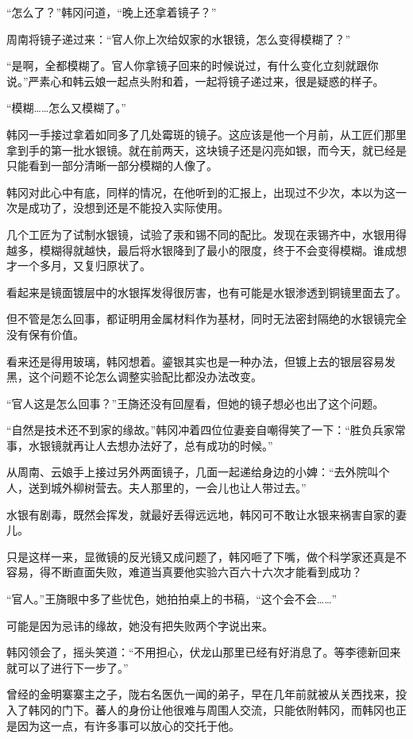 “怎么了？”韩冈问道，“晚上还拿着镜子？”

周南将镜子递过来：“官人你上次给奴家的水银镜，怎么变得模糊了？”

“是啊，全都模糊了。官人你拿镜子回来的时候说过，有什么变化立刻就跟你说。”严素心和韩云娘一起点头附和着，一起将镜子递过来，很是疑惑的样子。

“模糊……怎么又模糊了。”

韩冈一手接过拿着如同多了几处霉斑的镜子。这应该是他一个月前，从工匠们那里拿到手的第一批水银镜。就在前两天，这块镜子还是闪亮如银，而今天，就已经是只能看到一部分清晰一部分模糊的人像了。

韩冈对此心中有底，同样的情况，在他听到的汇报上，出现过不少次，本以为这一次是成功了，没想到还是不能投入实际使用。

几个工匠为了试制水银镜，试验了汞和锡不同的配比。发现在汞锡齐中，水银用得越多，模糊得就越快，最后将水银降到了最小的限度，终于不会变得模糊。谁成想才一个多月，又复归原状了。

看起来是镜面镀层中的水银挥发得很厉害，也有可能是水银渗透到铜镜里面去了。

但不管是怎么回事，都证明用金属材料作为基材，同时无法密封隔绝的水银镜完全没有保有价值。

看来还是得用玻璃，韩冈想着。鎏银其实也是一种办法，但镀上去的银层容易发黑，这个问题不论怎么调整实验配比都没办法改变。

“官人这是怎么回事？”王旖还没有回屋看，但她的镜子想必也出了这个问题。

“自然是技术还不到家的缘故。”韩冈冲着四位位妻妾自嘲得笑了一下：“胜负兵家常事，水银镜就再让人去想办法好了，总有成功的时候。”

从周南、云娘手上接过另外两面镜子，几面一起递给身边的小婢：“去外院叫个人，送到城外柳树营去。夫人那里的，一会儿也让人带过去。”

水银有剧毒，既然会挥发，就最好丢得远远地，韩冈可不敢让水银来祸害自家的妻儿。

只是这样一来，显微镜的反光镜又成问题了，韩冈咂了下嘴，做个科学家还真是不容易，得不断直面失败，难道当真要他实验六百六十六次才能看到成功？

“官人。”王旖眼中多了些忧色，她拍拍桌上的书稿，“这个会不会……”

可能是因为忌讳的缘故，她没有把失败两个字说出来。

韩冈领会了，摇头笑道：“不用担心，伏龙山那里已经有好消息了。等李德新回来就可以了进行下一步了。”

曾经的金明寨寨主之子，陇右名医仇一闻的弟子，早在几年前就被从关西找来，投入了韩冈的门下。蕃人的身份让他很难与周围人交流，只能依附韩冈，而韩冈也正是因为这一点，有许多事可以放心的交托于他。

